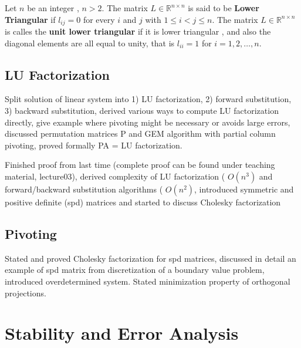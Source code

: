 \documentclass{article}
\theoremstyle{remark}
\begin{document}
 \begin{definition}
   Let $n$ be an integer , $n> 2$. The matrix $L \in \mathbb{R}^{n\times n}$ is said to be \textbf{Lower Triangular} if $l_{ij} = 0$ for every $i$ and $j$ with $1 \le i < j \le n$. The matrix $L \in \mathbb{R}^{n\times n }$ is calles the \textbf{unit lower triangular }  if it is lower triangular , and also the diagonal elements are all equal to unity, that is $l_{ii} = 1$  for $i = 1,2, \ldots , n$.
 \end{definition}
 


\subsection{LU Factorization}%
\label{sub:lu_factorization}
\begin{tcolorbox}
  Split solution of linear system into 1) LU factorization, 2) forward substitution, 3) backward substitution, derived various ways to compute LU factorization directly, give example where pivoting might be necessary or avoids large errors,  discussed permutation matrices P and GEM algorithm with partial column pivoting, proved formally PA = LU factorization. 
\end{tcolorbox}


\begin{tcolorbox}
  Finished proof from last time (complete proof can be found under teaching material, lecture03), derived complexity of LU factorization ( $O(n^3)$  and forward/backward substitution algorithms ( $O(n^2)$, introduced symmetric and positive definite (spd) matrices and started to discuss Cholesky factorization	
\end{tcolorbox}

\subsection{Pivoting}%
\label{sub:pivoting}
\begin{tcolorbox}
  Stated and proved Cholesky factorization for spd matrices, discussed in detail an example of spd matrix from discretization of a boundary value problem, introduced overdetermined system. Stated minimization property of orthogonal projections.
\end{tcolorbox}

\newpage
\section{Stability and Error Analysis}%
\label{sec:stability_and_error_analysis}
\end{document}
